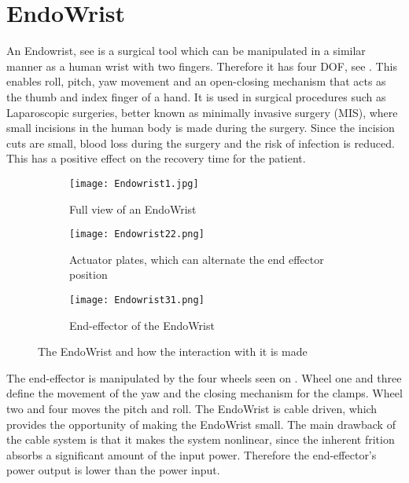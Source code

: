 \section{EndoWrist}\label{sec:Endowrist}

An Endowrist, see  is a surgical tool which can be manipulated in a similar manner as a human wrist with two fingers. Therefore it has four \gls{DOF}, see . This enables roll, pitch, yaw movement and an open-closing mechanism that acts as the thumb and index finger of a hand.  It is used in surgical procedures such as Laparoscopic surgeries, better known as minimally invasive surgery (MIS), where small incisions in the human body is made during the surgery. Since the incision cuts are small, blood loss during the surgery and the risk of infection is reduced. This has a positive effect on the recovery time for the patient.


\begin{figure}[H]
	\centering
	\begin{subfigure}{.32\textwidth}
		\centering
		\texttt{[image: Endowrist1.jpg]}
		\caption{Full view of an EndoWrist\vspace{8.5mm}   }
		\label{fig:Endo_full}
	\end{subfigure}
	\begin{subfigure}{.32\textwidth}
		\centering
		\texttt{[image: Endowrist22.png]}
		\caption{Actuator plates, which can alternate the end effector position}
		\label{fig:Endo_plates}
	\end{subfigure}
	\begin{subfigure}{.32\textwidth}
		\centering
		\texttt{[image: Endowrist31.png]}
		\caption{End-effector of the EndoWrist\newline}
		\label{fig:Endo_end}
	\end{subfigure}
\caption{The EndoWrist and how the interaction with it is made}
\label{fig:endowrits_set}
\end{figure}


The end-effector is manipulated by the four wheels seen on . Wheel one and three define the movement of the yaw and the closing mechanism for the clamps. Wheel two and four moves the pitch and roll. The EndoWrist is cable driven, which provides the opportunity of making the EndoWrist small. The main drawback of the cable system is that it makes the system nonlinear, since the inherent frition absorbs a significant amount of the input power. Therefore the end-effector's power output is lower than the power input.